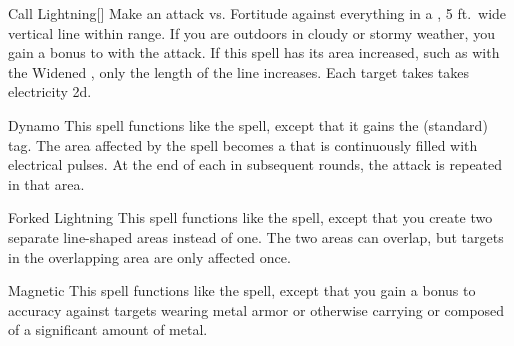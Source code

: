 \lowercase{\hypertarget{spell:Call Lightning}{}}\label{spell:Call Lightning}
\begin{ability}[\nth{2}]{\hypertarget{spell:Call Lightning}{Call Lightning}}[]
Make an attack vs. Fortitude against everything in a \arealarge, 5 ft.\ wide vertical line within \rngmed range.
If you are outdoors in cloudy or stormy weather, you gain a  bonus to  with the attack.
If this spell has its area increased, such as with the Widened , only the length of the line increases.
\hit Each target takes takes electricity  \plus2d.
\end{ability}
\vspace{0.25em}



\lowercase{\hypertarget{spell:Dynamo}{}}\label{spell:Dynamo}
\begin{ability}[\nth{2}]{\hypertarget{spell:Dynamo}{Dynamo}}
This spell functions like the  spell, except that it gains the  (standard) tag.
The area affected by the spell becomes a  that is continuously filled with electrical pulses.
At the end of each  in subsequent rounds, the attack is repeated in that area.
\end{ability}
\vspace{0.25em}



\lowercase{\hypertarget{spell:Forked Lightning}{}}\label{spell:Forked Lightning}
\begin{ability}[\nth{2}]{\hypertarget{spell:Forked Lightning}{Forked Lightning}}
This spell functions like the  spell, except that you create two separate line-shaped areas instead of one.
The two areas can overlap, but targets in the overlapping area are only affected once.
\end{ability}
\vspace{0.25em}



\lowercase{\hypertarget{spell:Magnetic}{}}\label{spell:Magnetic}
\begin{ability}[\nth{2}]{\hypertarget{spell:Magnetic}{Magnetic}}
This spell functions like the  spell, except that you gain a  bonus to accuracy against targets wearing metal armor or otherwise carrying or composed of a significant amount of metal.
\end{ability}
\vspace{0.25em}



